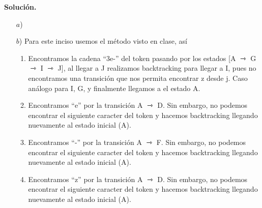 \textbf{Solución.} 
\begin{itemize}
\item[$a$)] 
\item[$b$)] Para este inciso usemos el método visto en clase, así
  \begin{enumerate}
  \item Encontramos la cadena ``3e-'' del token pasando por los estados [A $\rightarrowtriangle$
    G $\rightarrowtriangle$ I $\rightarrowtriangle$ J], al llegar a J realizamos backtracking para
    llegar a I, pues no encontramos una transición que nos permita encontrar z desde j. Caso análogo
    para I, G, y finalmente llegamos a el estado A.
  \item Encontramos ``e'' por la transición A $\rightarrowtriangle$ D. Sin embargo, no podemos encontrar
    el siguiente caracter del token y hacemos backtracking llegando nuevamente al estado inicial (A).
  \item Encontramos ``-'' por la transición A $\rightarrowtriangle$ F. Sin embargo, no podemos encontrar
    el siguiente caracter del token y hacemos backtracking llegando nuevamente al estado inicial (A).
  \item Encontramos ``z'' por la transición A $\rightarrowtriangle$ D. Sin embargo, no podemos encontrar
    el siguiente caracter del token y hacemos backtracking llegando nuevamente al estado inicial (A).
  \end{enumerate}
\end{itemize}
